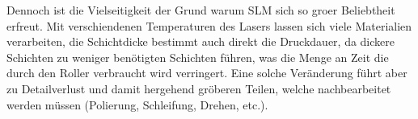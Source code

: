 \documentclass[../main.tex]{subfiles}
\begin{document}
Dennoch ist die Vielseitigkeit der Grund warum SLM sich so groer Beliebtheit erfreut. Mit verschiendenen Temperaturen des Lasers lassen sich viele Materialien verarbeiten, die Schichtdicke bestimmt auch direkt die Druckdauer, da dickere Schichten zu weniger benötigten Schichten führen, was die Menge an Zeit die durch den Roller verbraucht wird verringert.
Eine solche Veränderung führt aber zu Detailverlust und damit hergehend gröberen Teilen, welche nachbearbeitet werden müssen (Polierung, Schleifung, Drehen, etc.). 
\end{document}
